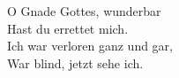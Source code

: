 O Gnade Gottes, wunderbar \\
Hast du errettet mich. \\
Ich war verloren ganz und gar, \\
War blind, jetzt sehe ich. \\
